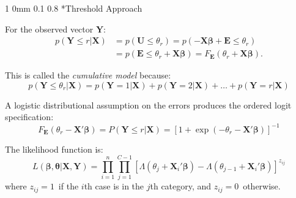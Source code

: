 \documentclass[12pt]{article}
\makeatletter
\newcommand{\B}{\boldsymbol{\beta}}
\newcommand{\T}{{\boldsymbol{\theta}}}
\newcommand{\Y}{\mathbf{Y}}
\newcommand{\9}{\\[9pt]}
\newcommand{\U}{\mathbf{U}}
\newcommand{\X}{\mathbf{X}}
\newcommand{\E}{\mathbf{E}}
\newcommand{\bgm}{\color{MyMath}}
\newcommand{\egm}{\color{white}}
\renewcommand{\section}{\@startsection
	    {section}%
	    {1}%
	    {0mm}%
	    {0.1\baselineskip}%
	    {0.8\baselineskip}%
	    {\newpage \color[cmyk]{0.43,0,0.01,0} \center\LARGE}}%
\makeatother
\begin{document}
\begin{landscape}
\begin{Large}
{\section*{Threshold Approach}
\begin{ohlist}
    \item   For the observed vector $\Y$:
            \bgm\begin{align*}
                        p(\Y \le r|\X) &= p(\U \le \theta_r) = p(-\X\B + \E \le \theta_r)       \9
                                       &= p(\E \le \theta_r+\X\B) = F_{\E}(\theta_r + \X\B).
            \end{align*}\egm
		    \vspace{-33pt}
	\item	This is called the \emph{cumulative model} because:
		    \bgm\begin{equation*}
				p(\Y \le \theta_r|\X) = p(\Y=1|\X) + p(\Y=2|\X) + \ldots + p(\Y=r|\X)
		    \end{equation*}\egm
		    \vspace{-33pt}
   	\item   A logistic distributional assumption on the errors produces the ordered logit specification:
        	\bgm\begin{equation*}
            		F_{\E}(\theta_r - \X'\B) = P(\Y\le r|\X) = [1+\exp(-\theta_r-\X'\B)]^{-1}
        	\end{equation*}\egm
		    \vspace{-33pt}
    \item   The likelihood function is:
            \bgm\begin{equation*}
                        L(\B,\T|\X,\Y) = \prod_{i=1}^{n}\prod_{j=1}^{C-1}\left[
                    		\Lambda(\theta_j + \X_i'\B) - \Lambda(\theta_{j-1} + \X_i'\B) \right]^{z_{ij}}
            \end{equation*}\egm
		    \vspace{-33pt}
		    where \bgm$z_{ij}=1$\egm\ if the \bgm$i$\egm th case is in the \bgm$j$\egm th category, and \bgm$z_{ij}=0$\egm\ otherwise.
\end{ohlist}

}
\end{Large}
\end{landscape}
\end{document}
